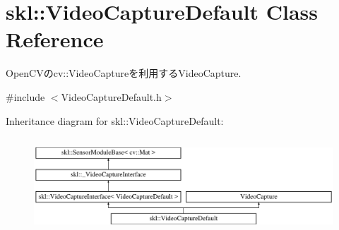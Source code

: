 \hypertarget{classskl_1_1_video_capture_default}{}\section{skl\+:\+:Video\+Capture\+Default Class Reference}
\label{classskl_1_1_video_capture_default}


Open\+C\+Vのcv\+::\+Video\+Captureを利用する\+Video\+Capture.  




{\ttfamily \#include $<$Video\+Capture\+Default.\+h$>$}

Inheritance diagram for skl\+:\+:Video\+Capture\+Default\+:\begin{figure}[H]
\begin{center}
\leavevmode
\includegraphics[height=3.601286cm]{classskl_1_1_video_capture_default}
\end{center}
\end{figure}
